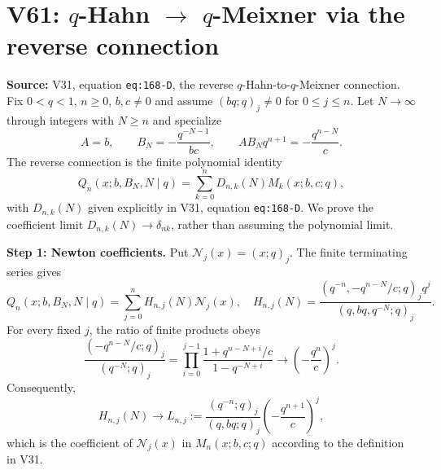 \documentclass[11pt]{article}
\begin{document}
\section{V61: $q$-Hahn $\longrightarrow$ $q$-Meixner via the reverse connection}
\noindent\textbf{Source:} V31, equation \texttt{eq:168-D}, the reverse $q$-Hahn-to-$q$-Meixner connection. Fix $0<q<1$, $n\ge0$, $b,c\ne0$ and assume $(bq;q)_j\ne0$ for $0\le j\le n$. Let $N\to\infty$ through integers with $N\ge n$ and specialize
\begin{equation}\label{eq:v61-path}
 A=b,\qquad B_N=-\frac{q^{-N-1}}{bc},\qquad AB_Nq^{n+1}=-\frac{q^{n-N}}c.
\end{equation}
The reverse connection is the finite polynomial identity
\begin{equation}\label{eq:v61-reverse}
 Q_n(x;b,B_N,N\mid q)=\sum_{k=0}^n D_{n,k}(N)M_k(x;b,c;q),
\end{equation}
with $D_{n,k}(N)$ given explicitly in V31, equation \texttt{eq:168-D}. We prove the coefficient limit $D_{n,k}(N)\to\delta_{nk}$, rather than assuming the polynomial limit.

\noindent\textbf{Step 1: Newton coefficients.} Put $\mathcal N_j(x)=(x;q)_j$. The finite terminating series gives
\begin{equation}\label{eq:v61-H}
 Q_n(x;b,B_N,N\mid q)=\sum_{j=0}^n H_{n,j}(N)\mathcal N_j(x),\quad
 H_{n,j}(N)=\frac{(q^{-n},-q^{n-N}/c;q)_j q^j}{(q,bq,q^{-N};q)_j}.
\end{equation}
For every fixed $j$, the ratio of finite products obeys
\begin{equation}\label{eq:v61-ratio}
 \frac{(-q^{n-N}/c;q)_j}{(q^{-N};q)_j}
 =\prod_{i=0}^{j-1}\frac{1+q^{n-N+i}/c}{1-q^{-N+i}}
 \longrightarrow \left(-\frac{q^n}{c}\right)^j.
\end{equation}
Consequently,
\begin{equation}\label{eq:v61-L}
 H_{n,j}(N)\longrightarrow L_{n,j}:=
 \frac{(q^{-n};q)_j}{(q,bq;q)_j}\left(-\frac{q^{n+1}}c\right)^j,
\end{equation}
which is the coefficient of $\mathcal N_j(x)$ in $M_n(x;b,c;q)$ according to the definition in V31.
\end{document}
